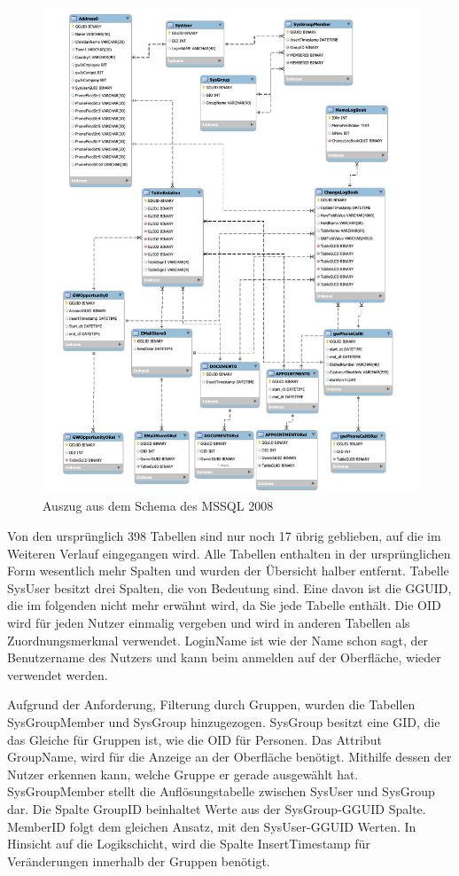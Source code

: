 \begin{figure}[htbp]
	\centering
  \includegraphics[width=1.0\textwidth]{pics/schema_alt.pdf}
	\caption{Auszug aus dem Schema des MSSQL 2008}
	\label{gw_schema_alt}
\end{figure}

Von den ursprünglich 398 Tabellen sind nur noch 17 übrig geblieben, auf die im Weiteren Verlauf eingegangen wird. Alle Tabellen enthalten in der ursprünglichen Form wesentlich mehr Spalten und wurden der Übersicht halber entfernt. Tabelle SysUser besitzt drei Spalten, die von Bedeutung sind. Eine davon ist die GGUID, die im folgenden nicht mehr erwähnt wird, da Sie jede Tabelle enthält. Die OID wird für jeden Nutzer einmalig vergeben und wird in anderen Tabellen als Zuordnungsmerkmal verwendet. LoginName ist wie der Name schon sagt, der Benutzername des Nutzers und kann beim anmelden auf der Oberfläche, wieder verwendet werden. 

Aufgrund der Anforderung, Filterung durch Gruppen, wurden die Tabellen SysGroupMember und SysGroup hinzugezogen. SysGroup besitzt eine GID, die das Gleiche für Gruppen ist, wie die OID für Personen. Das Attribut GroupName, wird für die Anzeige an der Oberfläche benötigt. Mithilfe dessen der Nutzer erkennen kann, welche Gruppe er gerade ausgewählt hat. SysGroupMember stellt die Auflösungstabelle zwischen SysUser und SysGroup dar. Die Spalte GroupID beinhaltet Werte aus der SysGroup-GGUID Spalte. MemberID folgt dem gleichen Ansatz, mit den SysUser-GGUID Werten. In Hinsicht auf die Logikschicht, wird die Spalte InsertTimestamp für Veränderungen innerhalb der Gruppen benötigt.

